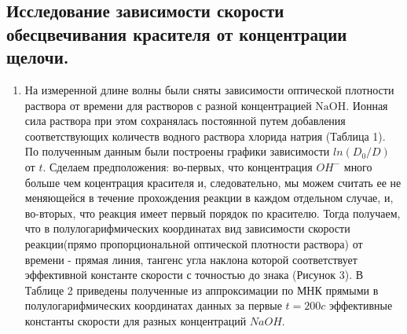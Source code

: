 \documentclass[a4paper,12pt]{article}
\begin{document}
\subsection{Исследование зависимости скорости обесцвечивания красителя от концентрации щелочи.}
\begin{enumerate}
    \item На измеренной длине волны были сняты зависимости оптической плотности раствора от времени для растворов с разной концентрацией $\mathrm{NaOH}$. Ионная сила раствора при этом сохранялась постоянной путем добавления соответствующих количеств водного раствора хлорида натрия (Таблица 1). По полученным данным были построены графики зависимости $ln(D_0/D)$ от $t$. Сделаем предположения: во-первых, что концентрация $OH^{-}$ много больше чем коцентрация красителя и, следовательно,  мы можем считать ее  не меняющейся в течение прохождения реакции в каждом отдельном случае, и, во-вторых, что реакция имеет первый порядок по красителю. Тогда получаем, что в полулогарифмических координатах вид зависимости скорости реакции(прямо пропорциональной оптической плотности раствора) от времени - прямая линия, тангенс угла наклона которой соответствует эффективной константе скорости с точностью до знака (Рисунок 3). В Таблице 2 приведены полученные из аппроксимации по МНК прямыми в полулогарифмических координатах данных за первые $t = 200 c$ эффективные константы скорости для разных концентраций $NaOH$.


\end{enumerate}
\end{document}
